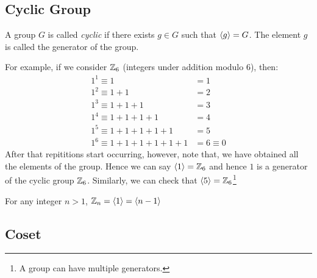 \subsection{Cyclic Group}
\begin{definition}
    A group $G$ is called \textit{cyclic} if there exists $g\in G$ such that $\left\langle g \right\rangle = G$. The element $g$ is called the generator of the group.
\end{definition}
For example, if we consider $\mathbb{Z}_6$ (integers under addition modulo 6), then:
\begin{align*}
    1^1 \equiv 1 &= 1\\
    1^2 \equiv 1+1 &=2\\ 
   1^3 \equiv 1+1+1 &=3\\  
   1^4 \equiv 1+1+1+1 &=4\\
   1^5 \equiv 1+1+1+1+1 &=5\\
 1^6 \equiv  1+1+1+1+1+1 &=6 \equiv 0
\end{align*}
    After that repititions start occurring, however, note that, we have obtained all the elements of the group. Hence we can say $\left\langle 1 \right\rangle = \mathbb{Z}_6$ and hence $1$ is a generator of the cyclic group $\mathbb{Z}_6$. Similarly, we can check that $\left\langle 5 \right\rangle=\mathbb{Z}_6$\footnote{A group can have multiple generators.}
    \begin{ffact}
    For any integer $n>1$, $\mathbb{Z}_n = \left\langle 1 \right\rangle = \left\langle n-1 \right\rangle$
    \end{ffact}
\subsection{Coset}
